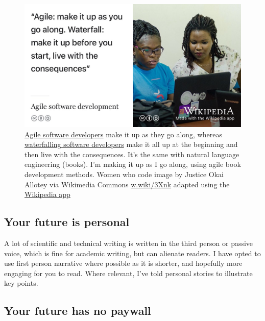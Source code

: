 \documentclass[
]{book}
\begin{document}
\begin{figure}

{\centering \includegraphics[width=1\linewidth]{images/agile-vs-waterfall} 

}

\caption{\href{https://en.wikipedia.org/wiki/Agile_software_development}{Agile software developers} make it up as they go along, whereas \href{https://en.wikipedia.org/wiki/Waterfall_model}{waterfalling software developers} make it all up at the beginning and then live with the consequences. It's the same with natural language engineering (books). I'm making it up as I go along, using agile book development methods. Women who code image by Justice Okai Allotey via Wikimedia Commons \href{https://w.wiki/3Xnk}{w.wiki/3Xnk} adapted using the \href{https://apps.apple.com/us/app/wikipedia/id324715238}{Wikipedia app}}\label{fig:agile-vs-waterfall-fig}
\end{figure}



\hypertarget{firstperson}{%
\subsection{Your future is personal}\label{firstperson}}

A lot of scientific and technical writing is written in the third person or passive voice, which is fine for academic writing, but can alienate readers. I have opted to use first person narrative where possible as it is shorter, and hopefully more engaging for you to read. \citep{googler} Where relevant, I've told personal stories to illustrate key points.

\hypertarget{openaccess}{%
\subsection{Your future has no paywall}\label{openaccess}}
\end{document}
